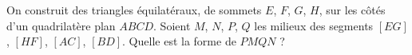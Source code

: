 On construit des triangles équilatéraux, de sommets $E$, $F$, $G$, $H$, sur les côtés d'un quadrilatère plan $ABCD$. Soient $M$, $N$, $P$, $Q$ les milieux des segments $[EG]$, $[HF]$, $[AC]$, $[BD]$. Quelle est la forme de $PMQN$ ?

